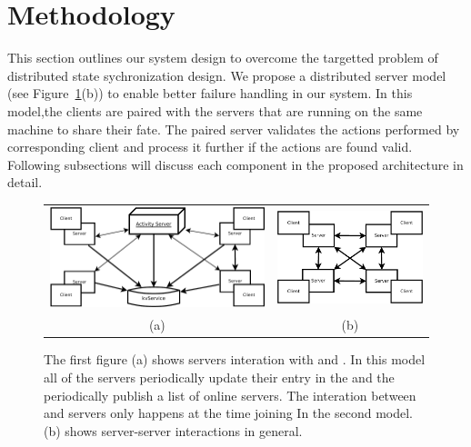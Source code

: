 
\section{Methodology}
\label{sec:methodology}

	This section outlines our system design to overcome the targetted problem of distributed state sychronization design. We propose a distributed server model (see Figure~\ref{figure:server-models}(b)) to enable better failure handling in our system. In this model,the clients are paired with the servers that are running on the same machine to share their fate. The paired server validates the actions performed by corresponding client and process it further if the actions are found valid. Following subsections will discuss each component in the proposed architecture in detail.

\begin{figure}[ht]
	\centering
	\begin{tabular}{c c}
		
		\includegraphics[width=0.52\linewidth]{../images/client-distributed-server-model-Activity1-crop.pdf} &
		\includegraphics[width=0.40\linewidth]{../images/client-distributed-server-model-crop.pdf} \\
		(a) & (b)
	\end{tabular}
	
	\caption{\label{figure:server-models} The first figure (a) shows servers interation with \activityServer and \kvService. In this model all of the servers periodically update their entry in the \kvService and the \activityServer periodically publish a list of online servers. The interation between \activityServer and servers only happens at the time joining In the second model.(b) shows server-server interactions in general.}
\end{figure}


